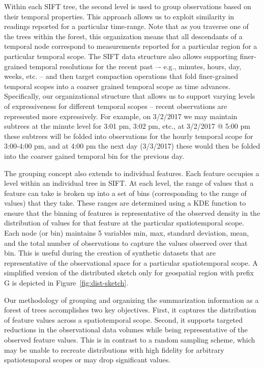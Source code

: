 Within each SIFT tree, the second level is used to group observations based on their temporal properties. This approach allows us to exploit similarity in readings reported for a particular time-range. Note that as you traverse one of the trees within the forest, this organization means that all descendants of a temporal node correspond to measurements reported for a particular region for a particular temporal scope. The SIFT data structure also allows supporting finer-grained temporal resolutions for the recent past –- e.g., minutes, hours, day, weeks, etc. – and then target compaction operations that fold finer-grained temporal scopes into a coarser grained temporal scope as time advances. Specifically, our organizational structure that allows us to support varying levels of expressiveness for different temporal scopes – recent observations are represented more expressively. For example, on 3/2/2017 we may maintain subtrees at the minute level for 3:01 pm, 3:02 pm, etc., at 3/2/2017 @ 5:00 pm these subtrees will be folded into observations for the hourly temporal scope for 3:00-4:00 pm, and at 4:00 pm the next day (3/3/2017) these would then be folded into the coarser gained temporal bin for the previous day. 

The grouping concept also extends to individual features. Each feature occupies a level within an individual tree in SIFT. At each level, the range of values that a feature can take is broken up into a set of bins (corresponding to the range of values) that they take. These ranges are determined using a KDE function to ensure that the binning of features is representative of the observed density in the distribution of values for that feature at the particular spatiotemporal scope. Each node (or bin) maintains 5 variables min, max, standard deviation, mean, and the total number of observations to capture the values observed over that bin.  This is useful during the creation of synthetic datasets that are representative of the observational space for a particular spatiotemporal scope. A simplified version of the distributed sketch only for geospatial region with prefix G is depicted in Figure~\ref{fig:dist-sketch}. 

Our methodology of grouping and organizing the summarization information as a forest of trees accomplishes two key objectives. First, it captures the distribution of feature values across a spatiotemporal scope. Second, it supports targeted reductions in the observational data volumes while being representative of the observed feature values. This is in contrast to a random sampling scheme, which may be unable to recreate distributions with high fidelity for arbitrary spatiotemporal scopes or may drop significant values.

